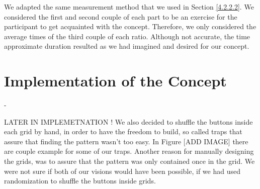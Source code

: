 We adapted the same measurement method that we used in Section \ref{4.2.2.2}. We considered the first and second couple of each part to be an exercise for the participant to get acquainted with the concept. Therefore, we only considered the average times of the third couple of each ratio. Although not accurate, the time approximate duration resulted as we had imagined and desired for our concept.

\section{Implementation of the Concept} \label{4.3}

- 

LATER IN IMPLEMETNATION ! 
We also decided to shuffle the buttons inside each grid by hand, in order to have the freedom to build, so called traps that assure that finding the pattern wasn't too easy. In Figure [ADD IMAGE] there are couple example for some of our traps. Another reason for manually designing the grids, was to assure that the pattern was only contained once in the grid. We were not sure if both of our visions would have been possible, if we had used randomization to shuffle the buttons inside grids. \\

